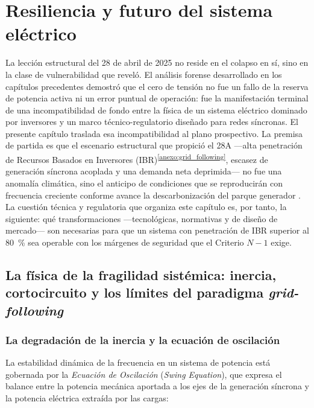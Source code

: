 

\chapter{Resiliencia y futuro del sistema eléctrico}
\label{ch:resiliencia_futuro}

La lección estructural del 28 de abril de 2025 no reside en el colapso en
sí, sino en la clase de vulnerabilidad que reveló. El análisis forense
desarrollado en los capítulos precedentes demostró que el cero de tensión
no fue un fallo de la reserva de potencia activa ni un error puntual de
operación: fue la manifestación terminal de una incompatibilidad de fondo
entre la física de un sistema eléctrico dominado por inversores y un marco
técnico-regulatorio diseñado para redes síncronas. El presente capítulo
traslada esa incompatibilidad al plano prospectivo. La premisa de partida
es que el escenario estructural que propició el 28A ---alta penetración de
Recursos Basados en Inversores
(IBR)\textsuperscript{\ref{anexo:grid_following}}, escasez de generación
síncrona acoplada y una demanda neta deprimida--- no fue una anomalía
climática, sino el anticipo de condiciones que se reproducirán con
frecuencia creciente conforme avance la descarbonización del parque
generador \cite{entsoe2025,futured2024}. La cuestión técnica y regulatoria
que organiza este capítulo es, por tanto, la siguiente: qué
transformaciones ---tecnológicas, normativas y de diseño de mercado---
son necesarias para que un sistema con penetración de IBR superior al
80~\% sea operable con los márgenes de seguridad que el Criterio $N-1$
exige.

\section{La física de la fragilidad sistémica: inercia, cortocircuito
y los límites del paradigma \textit{grid-following}}
\label{sec:fisica_fragilidad}

\subsection{La degradación de la inercia y la ecuación de oscilación}
\label{subsec:inercia_swing}

La estabilidad dinámica de la frecuencia en un sistema de potencia está
gobernada por la \textit{Ecuación de Oscilación} (\textit{Swing
Equation}), que expresa el balance entre la potencia mecánica aportada
a los ejes de la generación síncrona y la potencia eléctrica extraída
por las cargas:

